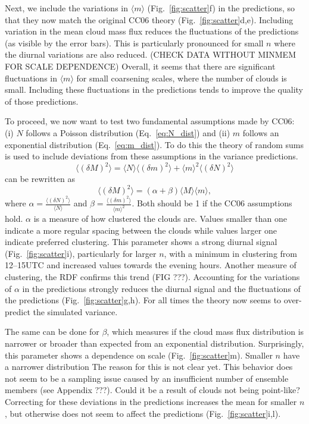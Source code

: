 \documentclass[a4paper, 12pt]{article}
\begin{document}
Next, we include the variations in $\langle m \rangle$ (Fig.~\ref{fig:scatter}f) in the predictions, so that they now match the original CC06 theory (Fig.~\ref{fig:scatter}d,e). Including variation in the mean cloud mass flux reduces the fluctuations of the predictions (as visible by the error bars). This is particularly pronounced for small $n$ where the diurnal variations are also reduced. (CHECK DATA WITHOUT MINMEM FOR SCALE DEPENDENCE) Overall, it seems that there are significant fluctuations in $\langle m \rangle$ for small coarsening scales, where the number of clouds is small. Including these fluctuations in the predictions tends to improve the quality of those predictions. 

To proceed, we now want to test two fundamental assumptions made by CC06: (i) $N$ follows a Poisson distribution (Eq.~\ref{eq:N_dist}) and (ii) $m$ follows an exponential distribution (Eq.~\ref{eq:m_dist}). To do this the theory of random sums \citep{Taylor1998} is used to include deviations from these assumptions in the variance predictions.
\begin{equation} \label{eq:derivation_1}
 \langle (\delta M)^2 \rangle = \langle N \rangle \langle (\delta m)^2 \rangle + \langle m \rangle^2 \langle (\delta N)^2 \rangle
\end{equation}
can be rewritten as
\begin{equation} \label{eq:alpha_beta}
 \langle (\delta M)^2 \rangle= (\alpha + \beta) \langle M \rangle \langle m \rangle,
\end{equation}
where $\alpha = \frac{\langle (\delta N)^2 \rangle}{\langle N \rangle}$ and $\beta = \frac{\langle (\delta m)^2 \rangle}{\langle m \rangle^2}$. Both should be 1 if the CC06 assumptions hold. $\alpha$ is a measure of how clustered the clouds are. Values smaller than one indicate a more regular spacing between the clouds while values larger one indicate preferred clustering. This parameter shows a strong diurnal signal (Fig.~\ref{fig:scatter}i), particularly for larger $n$, with a minimum in clustering from 12--15UTC and increased values towards the evening hours. Another measure of clustering, the RDF confirms this trend (FIG ???). Accounting for the variations of $\alpha$ in the predictions strongly reduces the diurnal signal and the fluctuations of the predictions (Fig.~\ref{fig:scatter}g,h). For all times the theory now seems to over-predict the simulated variance.

The same can be done for $\beta$, which measures if the cloud mass flux distribution is narrower or broader than expected from an exponential distribution. Surprisingly, this parameter shows a dependence on scale (Fig.~\ref{fig:scatter}m). Smaller $n$ have a narrower distribution The reason for this is not clear yet. This behavior does not seem to be a sampling issue caused by an insufficient number of ensemble members (see Appendix ???). Could it be a result of clouds not being point-like? Correcting for these deviations in the predictions increases the mean for smaller $n$, but otherwise does not seem to affect the predictions (Fig.~\ref{fig:scatter}i,l).
\end{document}
